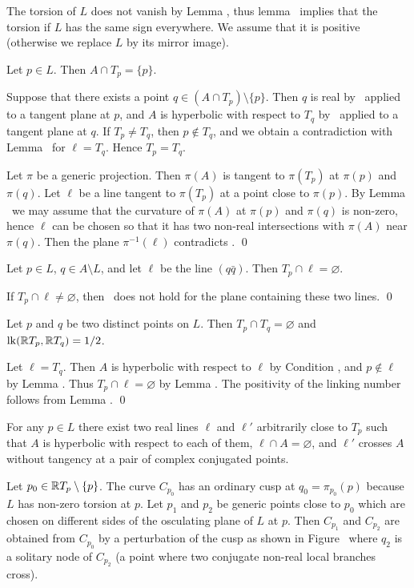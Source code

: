 The torsion of $L$ does not vanish by Lemma \lemTors, thus
lemma \lemHypPos\ implies that the torsion if $L$ has the same sign everywhere.
We assume that it is positive (otherwise we replace $L$ by its mirror image).

Let $p\in L$. Then $A\cap T_p = \{p\}$.
\endproclaim

Suppose that there exists a point $q\in (A\cap T_p)\setminus\{p\}$.
Then $q$ is real by \CondH\ applied to a tangent plane at $p$,
and $A$ is hyperbolic with respect to $T_q$ by \CondH\ applied to a tangent plane at $q$.
If $T_p\ne T_q$, then $p\not\in T_q$, and we obtain a contradiction with Lemma \lemHypK\ for $\ell=T_q$.
Hence $T_p=T_q$.

Let $\pi$ be a generic projection. Then $\pi(A)$ is tangent to $\pi(T_p)$ at $\pi(p)$ and $\pi(q)$.
Let $\ell$ be a line tangent to $\pi(T_p)$ at a point close to $\pi(p)$.
By Lemma \lemTors\ we may assume that the curvature of $\pi(A)$ at $\pi(p)$ and $\pi(q)$ is non-zero,
hence $\ell$ can be chosen so that it has two non-real intersections with $\pi(A)$ near $\pi(q)$.
Then the plane $\pi^{-1}(\ell)$ contradicts \CondH. 
\qed\enddemo

Let $p\in L$, $q\in A\setminus L$, and let $\ell$ be the line $(q\bar q)$.
Then $T_p\cap\ell = \varnothing$.
\endproclaim

 If $T_p\cap\ell \ne \varnothing$, then \CondH\
does not hold for the plane containing these two lines.
\qed\enddemo

 Let $p$ and $q$ be two distinct points on $L$.
Then $T_{p}\cap T_{q}=\varnothing$
and $\operatorname{lk}(\Bbb R T_p,\Bbb R T_q)=1/2$.
\endproclaim

 Let $\ell=T_q$. Then $A$ is hyperbolic with respect to $\ell$ by Condition \CondH, and
$p\not\in\ell$ by Lemma \lemHypII.
Thus $T_p\cap\ell=\varnothing$ by Lemma \lemHypK.
The positivity of the linking number follows from Lemma \lemHypPos.
\qed\enddemo

 For any $p\in L$
there exist two real lines $\ell$ and $\ell'$ arbitrarily close to $T_p$
such that $A$ is hyperbolic with respect to each of them, $\ell\cap A=\varnothing$, and
$\ell'$ crosses $A$ without tangency at a pair of complex conjugated points.
\endproclaim

Let $p_0\in\Bbb R T_p\setminus\{p\}$.
The curve $C_{p_0}$ has an ordinary cusp at $q_0=\pi_{p_0}(p)$ because $L$ has non-zero torsion at $p$.
Let $p_1$ and $p_2$ be generic points close to $p_0$ which are chosen on different sides of
the osculating plane of $L$ at $p$. Then $C_{p_1}$ and $C_{p_2}$ are
obtained from $C_{p_0}$ by a perturbation of the cusp as shown in Figure \figCusp\ where
$q_2$ is a solitary node of $C_{p_2}$ (a point where two conjugate non-real local branches cross).

